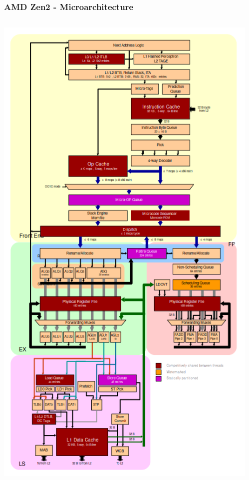 \documentclass{beamer}
\begin{document}
\begin{frame}
\frametitle{AMD Zen2 - Microarchitecture}

\begin{columns}[T]
\begin{column}{0.34\textwidth}
\includegraphics[width=\textwidth]{fig/amd_zen2.png}
\end{column}
\begin{column}{0.66\textwidth}

\end{column}
\end{columns}
\end{frame}
\end{document}
